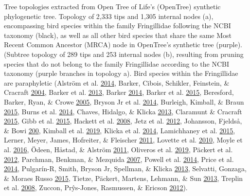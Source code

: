 Tree topologies extracted from Open Tree of Life's (OpenTree) synthetic phylogenetic tree.
Topology of 2,333 tips and 1,305 internal nodes (a), encompassing bird species within the family Fringillidae following the NCBI taxonomy (black), as well as all other bird species that share the same Most Recent Common Ancestor (MRCA) node in OpenTree's synthetic tree (purple).
(Subtree topology of 289 tips and 253 internal nodes (b), resulting from pruning species that do not belong to the family Fringillidae according to the NCBI taxonomy (purple branches in topology a).
Bird species within the Fringillidae are paraphyletic
(Alström et al. \protect\hyperlink{ref-alstrom2014discovery}{2014},
Barker, Cibois, Schikler, Feinstein, \& Cracraft \protect\hyperlink{ref-barker2004phylogeny}{2004},
Barker et al. \protect\hyperlink{ref-barker2013going}{2013},
Barker \protect\hyperlink{ref-barker2014mitogenomic}{2014},
Barker et al. \protect\hyperlink{ref-barker2015new}{2015},
Beresford, Barker, Ryan, \& Crowe \protect\hyperlink{ref-beresford2005african}{2005},
Bryson Jr et al. \protect\hyperlink{ref-bryson2014diversification}{2014},
Burleigh, Kimball, \& Braun \protect\hyperlink{ref-burleigh2015building}{2015},
Burns et al. \protect\hyperlink{ref-burns2014phylogenetics}{2014},
Chaves, Hidalgo, \& Klicka \protect\hyperlink{ref-chaves2013biogeography}{2013},
Claramunt \& Cracraft \protect\hyperlink{ref-claramunt2015new}{2015},
Gibb et al. \protect\hyperlink{ref-gibb2015new}{2015},
Hackett et al. \protect\hyperlink{ref-hackett2008phylogenomic}{2008},
Jetz et al. \protect\hyperlink{ref-Jetz2012}{2012},
Johansson, Fjeldså, \& Bowi \protect\hyperlink{ref-johansson2008phylogenetic}{200},
Kimball et al. \protect\hyperlink{ref-kimball2019phylogenomic}{2019},
Klicka et al. \protect\hyperlink{ref-klicka2014comprehensive}{2014},
Lamichhaney et al. \protect\hyperlink{ref-lamichhaney2015evolution}{2015},
Lerner, Meyer, James, Hofreiter, \& Fleischer \protect\hyperlink{ref-lerner2011multilocus}{2011},
Lovette et al. \protect\hyperlink{ref-lovette2010comprehensive}{2010},
Moyle et al. \protect\hyperlink{ref-moyle2016tectonic}{2016},
Ödeen, Håstad, \& Alström \protect\hyperlink{ref-odeen2011evolution}{2011},
Oliveros et al. \protect\hyperlink{ref-oliveros2019earth}{2019},
Päckert et al. \protect\hyperlink{ref-packert2012horizontal}{2012},
Parchman, Benkman, \& Mezquida \protect\hyperlink{ref-parchman2007coevolution}{2007},
Powell et al. \protect\hyperlink{ref-powell2014comprehensive}{2014},
Price et al. \protect\hyperlink{ref-price2014niche}{2014},
Pulgarín-R, Smith, Bryson Jr, Spellman, \& Klicka \protect\hyperlink{ref-pulgarin2013multilocus}{2013},
Selvatti, Gonzaga, \& Moraes Russo \protect\hyperlink{ref-selvatti2015paleogene}{2015},
Tietze, Päckert, Martens, Lehmann, \& Sun \protect\hyperlink{ref-tietze2013complete}{2013},
Treplin et al. \protect\hyperlink{ref-treplin2008molecular}{2008},
Zuccon, Prŷs-Jones, Rasmussen, \& Ericson \protect\hyperlink{ref-zuccon2012phylogenetic}{2012}).


